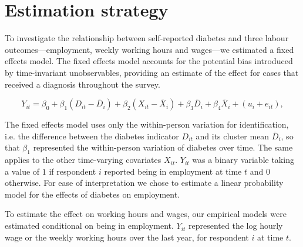 \documentclass[12pt,english]{article}
\begin{document}

\section{\label{sec:Estimation Strategy}Estimation strategy}

To investigate the relationship between self-reported diabetes and three labour outcomes---employment, weekly working hours and wages---we estimated a fixed effects model. The fixed effects  model accounts for the potential bias introduced by time-invariant unobservables, providing an estimate of the effect for cases that received a diagnosis throughout the survey.


\begin{equation}
Y_{it}=\beta_{0}+\beta_{1}(D_{it}-\overline{D}_{i})+\beta_{2}(X_{it}-\overline{X}_i)+\beta_{3}\overline{D}_{i}+\beta_{4}\overline{X}_i+(u_{i}+e_{it}),\label{eq:cha4_employed}
\end{equation}

The fixed effects model uses only the  within-person variation for identification, i.e. the difference between the diabetes indicator $D_{it}$ and its cluster mean $\overline{D}_{i}$, so that $\beta_{1}$ represented the within-person variation of diabetes over time. The same applies to the other time-varying covariates $X_{it}$. $Y_{it}$ was a binary variable taking a value of $1$ if respondent $i$ reported being in employment at time $t$ and $0$ otherwise. For ease of interpretation we chose to estimate a linear probability model for the effects of diabetes on employment.

To estimate the effect on working hours and wages, our empirical models were estimated conditional on being in employment. $Y_{it}$ represented the log hourly wage or the weekly working hours over the last year, for respondent $i$ at time $t$.
\end{document}

